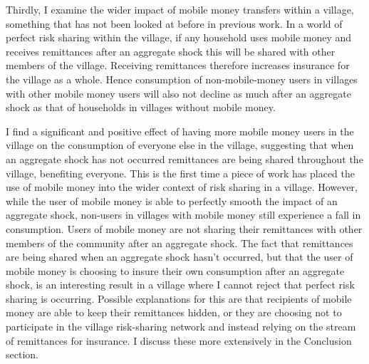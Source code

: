 Thirdly, I  examine the wider impact of mobile money transfers within a village, something that has not been looked at before in previous work. In a world of perfect risk sharing within the village, if any household  uses mobile money and receives remittances after an aggregate shock this will be shared with other members of the village.  Receiving remittances therefore increases  insurance for the village as a whole. Hence consumption of non-mobile-money users in villages with other mobile money users will also not decline as much after an aggregate shock as that of households in villages without mobile money.

I find a significant and positive effect of having more mobile money users in the village on the consumption of everyone else in the village, suggesting that when an aggregate shock has not occurred remittances are being shared throughout the village, benefiting everyone. This is the first time a piece of work has placed the use of mobile money into the wider context of risk sharing in a village. However, while the user of mobile money is able to perfectly smooth the impact of an aggregate shock, non-users in villages with mobile money still experience a fall in consumption. Users of mobile money are not sharing their remittances with other members of the community after an aggregate shock. The fact that remittances are being shared when an aggregate shock hasn't occurred, but that the user of mobile money is choosing to insure their own consumption after an aggregate shock, is an interesting result in a village where I cannot reject that perfect risk sharing is occurring. Possible explanations for this are that recipients of mobile money are able to keep their remittances hidden, or they are choosing not to participate in the village risk-sharing network and instead relying on the stream of remittances for insurance. I discuss these more extensively in the Conclusion section. 
